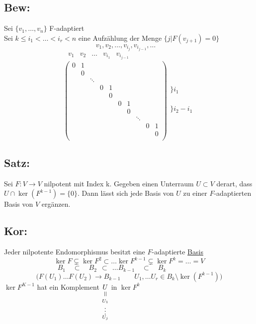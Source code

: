 \documentclass[titlepage,12pt,a4paper,ngerman]{report}
\newcommand{\verteq}{\rotatebox{90}{$\,=$}}
\newcommand{\equalto}[2]{\underset{\scriptstyle\overset{\mkern4mu\verteq}{#2}}{#1}}
\begin{document}
\subsection{Bew:}
Sei $  \{v_1,\dots,v_n\} $ F-adaptiert\\
Sei $ k \le i_1 < \dots < i_r < n $ eine Aufzählung der Menge $ \{j | F(v_{j+1})=0\} $
\nopagebreak
$$v_1,v_2,\dots,v_{i_j},v_{i_{j-1}}, \dots\quad $$
\nopagebreak
$$ \begin{array}{rrrrrrrrrrrrrrrr}
v_1 & v_2 & \dots & v_{i_1} & v_{i_{j-1}} & & & & & & & & & & &
\end{array} $$
$$\begin{pmatrix}
0 & 1\\
& 0 \\
& & \ddots\\
& & & 0 & 1\\
& & & & 0\\
& & & & & 0 & 1\\
& & & & & & 0 \\
& & & & & & & \ddots\\
& & & & & & & & 0 & 1\\
& & & & & & & & & 0\\
\end{pmatrix} \begin{array}{l}
\\
\\
\bigg\} i_1\\
\\
\\
\\
\bigg\} i_2-i_1\\
\\
\\
\end{array}$$


\subsection{Satz:}
Sei $ F: V \to V  $ nilpotent mit Index k. Gegeben einen Unterraum $ U \subset V $ derart, dass $ U \cap \ker(F^{k-1}) = \{0\} $. Dann lässt sich jede Basis von $ U $ zu einer $ F $-adaptierten Basis von $ V $ ergänzen.

\subsection{Kor:}
Jeder nilpotente Endomorphismus besitzt eine $ F $-adaptierte \underline{Basis}
$$ \ker F \subsetneq \ker F^2 \subset \dots \ker F^{k-1} \subsetneq \ker F^k = \dots = V$$
$$ B_1 \quad \subset \quad  B_2 \ \ \subset \ \  \dots B_{k-1} \quad \subset \quad B_k \qquad \qquad \quad $$
$$\bigg(F(U_1) \dots F(U_2) \rightarrow B_{k-1} \qquad U_1, \dots U_r \in B_k \setminus \ker(F^{k-1}) \bigg)$$
$ \ker F^{K-1} $ hat ein Komplement $ \equalto{U}{\substack{U_1 \\ \vdots \\ U_j}}  $ in $ \ker F^k $
\end{document}
